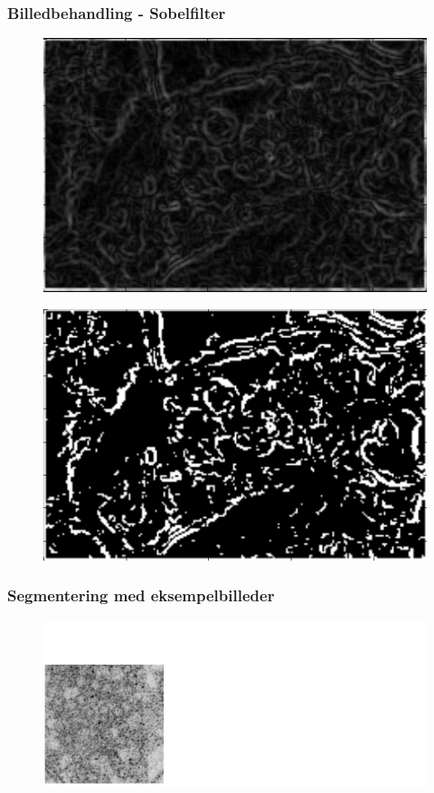 \documentclass[12pt,t]{beamer}
\begin{document}
\begin{frame}
\frametitle{Billedbehandling - Sobelfilter}
\begin{figure}[H]
	\centering
	\includegraphics[scale=0.4]{../files/premethod/img/sobel3.png}
\end{figure}
\begin{figure}[H]
	\centering
	\includegraphics[scale=0.4]{../files/premethod/img/edgemap2.png}
\end{figure}
\end{frame}



\begin{frame}
\frametitle{Segmentering med eksempelbilleder}
\begin{figure}[H]
\includegraphics[scale=0.35]{img/afstand/3.png}
\end{figure}
\end{frame}
\end{document}
